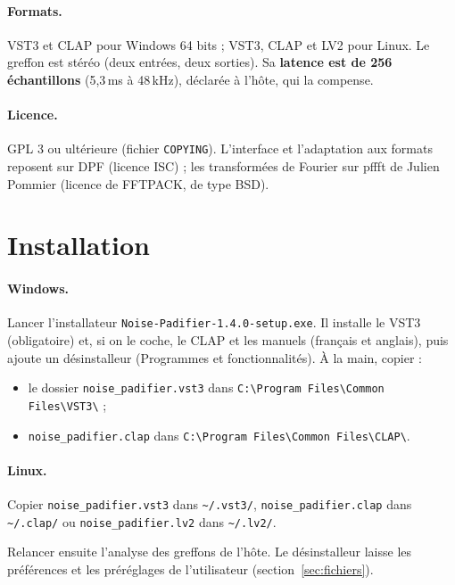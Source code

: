 \documentclass[a4paper,11pt]{article}
\begin{document}
\paragraph{Formats.} VST3 et CLAP pour Windows 64 bits ; VST3, CLAP et LV2 pour Linux. Le greffon
est stéréo (deux entrées, deux sorties). Sa \textbf{latence est de 256 échantillons} (5,3\,ms à
48\,kHz), déclarée à l'hôte, qui la compense.

\paragraph{Licence.} GPL 3 ou ultérieure (fichier \texttt{COPYING}). L'interface et l'adaptation
aux formats reposent sur DPF (licence ISC) ; les transformées de Fourier sur pffft de Julien
Pommier (licence de FFTPACK, de type BSD).

\section{Installation}

\paragraph{Windows.} Lancer l'installateur \texttt{Noise-Padifier-1.4.0-setup.exe}. Il installe
le VST3 (obligatoire) et, si on le coche, le CLAP et les manuels (français et anglais), puis
ajoute un désinstalleur (\og Programmes et fonctionnalités\fg). À la main, copier :
\begin{itemize}
\item le dossier \texttt{noise\_padifier.vst3} dans \verb|C:\Program Files\Common Files\VST3\| ;
\item \texttt{noise\_padifier.clap} dans \verb|C:\Program Files\Common Files\CLAP\|.
\end{itemize}

\paragraph{Linux.} Copier \texttt{noise\_padifier.vst3} dans \verb|~/.vst3/|,
\texttt{noise\_padifier.clap} dans \verb|~/.clap/| ou \texttt{noise\_padifier.lv2} dans
\verb|~/.lv2/|.

Relancer ensuite l'analyse des greffons de l'hôte. Le désinstalleur laisse les préférences et
les préréglages de l'utilisateur (section~\ref{sec:fichiers}).
\end{document}
